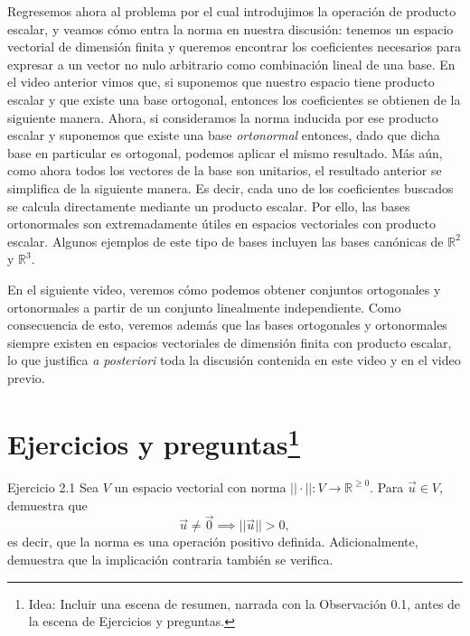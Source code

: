 \documentclass[12pt,dvipsnames]{article}
\numberwithin{equation}{section}
\begin{document}
Regresemos ahora al problema por el cual introdujimos la operación de producto escalar, y veamos cómo entra la norma en nuestra discusión: tenemos un espacio vectorial de dimensión finita y queremos encontrar los coeficientes necesarios para expresar a un vector no nulo arbitrario como combinación lineal de una base. En el video anterior vimos que, si suponemos que nuestro espacio tiene producto escalar y que existe una base ortogonal, entonces los coeficientes se obtienen de la siguiente manera. Ahora, si consideramos la norma inducida por ese producto escalar y suponemos que existe una base \emph{ortonormal} entonces, dado que dicha base en particular es ortogonal, podemos aplicar el mismo resultado. Más aún, como ahora todos los vectores de la base son unitarios, el resultado anterior se simplifica de la siguiente manera. Es decir, cada uno de los coeficientes buscados se calcula directamente mediante un producto escalar. Por ello, las bases ortonormales son extremadamente útiles en espacios vectoriales con producto escalar. Algunos ejemplos de este tipo de bases incluyen las bases canónicas de $\mathbb{R}^2$ y $\mathbb{R}^3$. 

En el siguiente video, veremos cómo podemos obtener conjuntos ortogonales y ortonormales a partir de un conjunto linealmente independiente. Como consecuencia de esto, veremos además que las bases ortogonales y ortonormales siempre existen en espacios vectoriales de dimensión finita con producto escalar, lo que justifica \emph{a posteriori} toda la discusión contenida en este video y en el video previo.


\newpage
\section{Ejercicios y preguntas\footnote{Idea: Incluir una escena de resumen, narrada con la Observación 0.1, antes de la escena de Ejercicios y preguntas.}}


Ejercicio 2.1 Sea $V$ un espacio vectorial con norma $||\cdot||:V\to \mathbb{R}^{\geq0}$. Para $\vec{u}\in V$, demuestra que \[
    \vec{u} \neq \vec{0} \implies ||\vec{u}|| > 0,
\] 
es decir, que la norma es una operación positivo definida. Adicionalmente, demuestra que la implicación contraria también se verifica. \\
\end{document}

